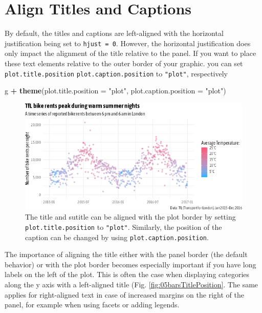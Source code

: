 \documentclass[
]{krantz}
\makeatletter
\newenvironment{Shaded}{\begin{snugshade}}{\end{snugshade}}
\newcommand{\AttributeTok}[1]{\textcolor[rgb]{0.27,0.27,0.27}{#1}}
\newcommand{\FunctionTok}[1]{\textcolor[rgb]{0.27,0.27,0.27}{\textbf{#1}}}
\newcommand{\NormalTok}[1]{#1}
\newcommand{\SpecialCharTok}[1]{\textcolor[rgb]{0.43,0.43,0.43}{\textbf{#1}}}
\newcommand{\StringTok}[1]{\textcolor[rgb]{0.5,0.5,0.5}{#1}}
\newenvironment{kframe}{%
\medskip{}
\setlength{\fboxsep}{.8em}
 \def\at@end@of@kframe{}%
 \ifinner\ifhmode%
  \def\at@end@of@kframe{\end{minipage}}%
  \begin{minipage}{\columnwidth}%
 \fi\fi%
 \def\FrameCommand##1{\hskip\@totalleftmargin \hskip-\fboxsep
 \colorbox{shadecolor}{##1}\hskip-\fboxsep
     \hskip-\linewidth \hskip-\@totalleftmargin \hskip\columnwidth}%
 \MakeFramed {\advance\hsize-\width
   \@totalleftmargin\z@ \linewidth\hsize
   \@setminipage}}%
 {\par\unskip\endMakeFramed%
 \at@end@of@kframe}
\renewenvironment{Shaded}{\begin{kframe}}{\end{kframe}}
\makeatother
\begin{document}
\hypertarget{align-titles-and-captions}{%
\section{Align Titles and Captions}\label{align-titles-and-captions}}

By default, the titles and captions are left-aligned with the horizontal justification being set to \texttt{hjust\ =\ 0}. However, the horizontal justification does only impact the alignment of the title relative to the panel. If you want to place these text elements relative to the outer border of your graphic. you can set \texttt{plot.title.position} \texttt{plot.caption.position} to \texttt{"plot"}, respectively

\begin{Shaded}
\begin{Highlighting}[]
\NormalTok{g }\SpecialCharTok{+} \FunctionTok{theme}\NormalTok{(}\AttributeTok{plot.title.position =} \StringTok{"plot"}\NormalTok{,}
          \AttributeTok{plot.caption.position =} \StringTok{"plot"}\NormalTok{)}
\end{Highlighting}
\end{Shaded}

\begin{figure}
\centering
\includegraphics{bookdown_files/figure-latex/05titleAlign-1.png}
\caption{\label{fig:05titleAlign}The title and sutitle can be aligned with the plot border by setting \texttt{plot.title.position} to \texttt{"plot"}. Similarly, the position of the caption can be changed by using \texttt{plot.caption.position}.}
\end{figure}

The importance of aligning the title either with the panel border (the default behavior) or with the plot border becomes especially important if you have long labels on the left of the plot. This is often the case when displaying categories along the y axis with a left-aligned title (Fig. \ref{fig:05barsTitlePosition}. The same applies for right-aligned text in case of increased margins on the right of the panel, for example when using facets or adding legends.
\end{document}
